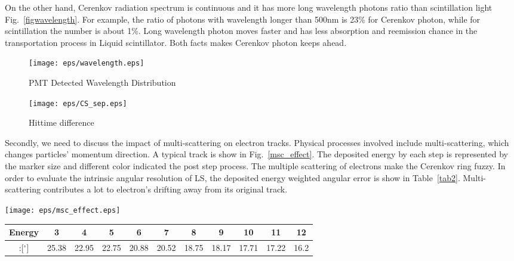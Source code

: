 \documentclass[a4paper,10pt]{cpc-hepnp}
\begin{document}
On the other hand, Cerenkov radiation spectrum is continuous and it has more
long wavelength
photons ratio than scintillation light Fig.~\ref{figwavelength}. 
For example, the ratio of photons with wavelength longer than 500nm is 23\% 
for Cerenkov photon, while for scintillation the number is about 1\%.
Long wavelength photon moves faster and has less absorption
and reemission chance in the transportation process in Liquid scintillator.
Both facts makes Cerenkov photon keeps ahead.
\begin{figure}[htbp]
\centering
\begin{minipage}{0.5\textwidth}
\centering
\texttt{[image: eps/wavelength.eps]}
\caption{PMT Detected Wavelength Distribution}
\end{minipage}%
\begin{minipage}{0.5\textwidth}
\centering
\texttt{[image: eps/CS\_sep.eps]}
\caption{Hittime difference}
\end{minipage}
\end{figure}

Secondly, we need to discuss the impact of multi-scattering on electron tracks.
Physical processes involved include multi-scattering, which changes
particles' momentum direction. A typical track is show in
Fig.~\ref{msc_effect}. The deposited energy by each step is
represented by the marker size and different color indicated the post step
process. The multiple scattering of electrons make the Cerenkov ring fuzzy. In order to
evaluate the intrinsic angular resolution of LS, the deposited energy weighted
angular error is show in Table~\ref{tab2}. Multi-scattering
contributes a lot to electron's drifting away from its original track.
\begin{center}
\texttt{[image: eps/msc\_effect.eps]}
\end{center}


\begin{center}
\footnotesize
\begin{tabular*}{170mm}{@{\extracolsep{\fill}}ccccccccccc}
\toprule Energy&3&4&5&6&7&8&9&10&11&12\\
\hline
:[$^{\circ}$]&25.38&22.95&22.75&20.88&20.52&18.75&18.17&17.71&17.22&16.2\\
\bottomrule
\end{tabular*}
\end{center}
\end{document}
